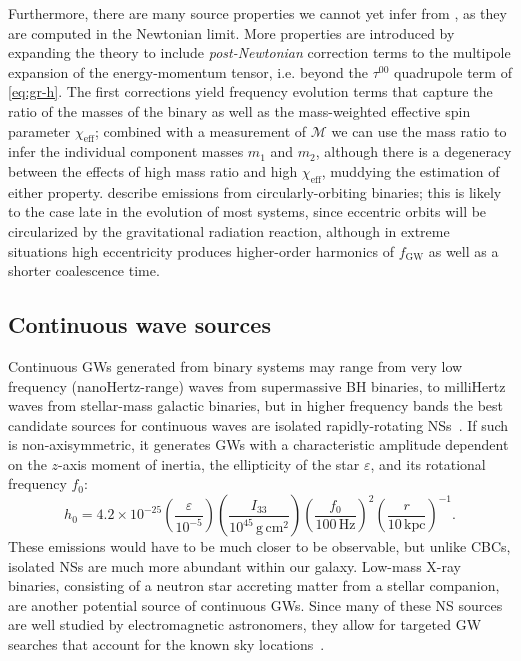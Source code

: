 Furthermore, there are many source properties we cannot yet infer from , as they are computed in the Newtonian limit.
More properties are introduced by expanding the theory to include \textit{post-Newtonian} correction terms to the multipole expansion of the energy-momentum tensor, i.e. beyond the $\tau^{00}$ quadrupole term of \cref{eq:gr-h}.
The first corrections yield frequency evolution terms that capture the ratio of the masses of the binary as well as the mass-weighted effective spin parameter $\chi_{\mathrm{eff}}$; combined with a measurement of $\mathcal{M}$ we can use the mass ratio to infer the individual component masses $m_1$ and $m_2$, although there is a degeneracy between the effects of high mass ratio and high $\chi_{\mathrm{eff}}$, muddying the estimation of either property.
 describe emissions from circularly-orbiting binaries; this is likely to the case late in the evolution of most systems, since eccentric orbits will be circularized by the gravitational radiation reaction, although in extreme situations high eccentricity produces higher-order harmonics of $f_{\textrm{GW}}$ as well as a shorter coalescence time.


\subsection{Continuous wave sources}

Continuous \acp{GW} generated from binary systems may range from very low frequency (nanoHertz-range) waves from supermassive \ac{BH} binaries, to milliHertz waves from stellar-mass galactic binaries, but in higher frequency bands the best candidate sources for continuous waves are isolated rapidly-rotating \acp{NS}~\citep{Riles_2017}.
If such  is non-axisymmetric, it generates \acp{GW} with a characteristic amplitude dependent on the $z$-axis moment of inertia, the ellipticity of the star $\varepsilon$,  and its rotational frequency $f_0$:
\begin{equation}
	h_0 = 4.2 \times 10^{-25}
		\left( \frac{\varepsilon}{10^{-5}} \right)
		\left( \frac{I_{33}}{10^{45}\,\mathrm{g\,cm^2}} \right)
		\left( \frac{f_0}{100\,\mathrm{Hz}} \right)^2
		\left( \frac{r}{10\,\mathrm{kpc}} \right)^{-1}.
\end{equation}
These emissions would have to be much closer to be observable, but unlike \acp{CBC}, isolated \acp{NS} are much more abundant within our galaxy.
Low-mass X-ray binaries, consisting of a neutron star accreting matter from a stellar companion, are another potential source of continuous \acp{GW}.
Since many of these \ac{NS} sources are well studied by electromagnetic astronomers, they allow for targeted GW searches that account for the known sky locations~\citep{cw_o3}.


